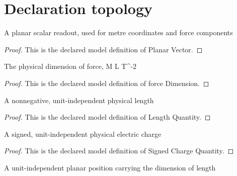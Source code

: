 \section{Declaration topology}
\begin{definition}
  \label{def:physics:phyx-mini-0894:phyxminiproblems-problemphyxmini0894-planarvector}
  A planar scalar readout, used for metre coordinates and force components
\end{definition}
\begin{proof}
  This is the declared model definition of Planar Vector.
\end{proof}
\begin{definition}
  \label{def:physics:phyx-mini-0894:phyxminiproblems-problemphyxmini0894-forcedimension}
  The physical dimension of force, M L T\textasciicircum{}-2
\end{definition}
\begin{proof}
  This is the declared model definition of force Dimension.
\end{proof}
\begin{definition}
  \label{def:physics:phyx-mini-0894:phyxminiproblems-problemphyxmini0894-lengthquantity}
  A nonnegative, unit-independent physical length
\end{definition}
\begin{proof}
  This is the declared model definition of Length Quantity.
\end{proof}
\begin{definition}
  \label{def:physics:phyx-mini-0894:phyxminiproblems-problemphyxmini0894-signedchargequantity}
  A signed, unit-independent physical electric charge
\end{definition}
\begin{proof}
  This is the declared model definition of Signed Charge Quantity.
\end{proof}
\begin{definition}
  \label{def:physics:phyx-mini-0894:phyxminiproblems-problemphyxmini0894-planarpositionquantity}
  A unit-independent planar position carrying the dimension of length
\end{definition}
